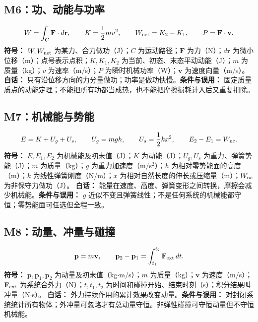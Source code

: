 \documentclass[UTF8,zihao=-4,openany,oneside,fontset=windows]{ctexbook}
\begin{document}
\subsection{M6：功、动能与功率}
\begin{equation}
W=\int_C\mathbf F\cdot d\mathbf r,\qquad K=\frac12mv^2,\qquad W_{\rm net}=K_2-K_1,\qquad P=\mathbf F\cdot\mathbf v.
\end{equation}
\textbf{符号：} $W,W_{\rm net}$ 为某力、合力做功（J）；$C$ 为运动路径；$\mathbf F$ 为力（N）；$d\mathbf r$ 为微小位移（m）；点号表示点积；$K,K_1,K_2$ 为当前、初态、末态平动动能（J）；$m$ 为质量（kg）；$v$ 为速率（m/s）；$P$ 为瞬时机械功率（W）；$\mathbf v$ 为速度向量（m/s）。
\textbf{白话：} 只有沿位移方向的力分量做功；功率是做功快慢。\textbf{条件与误用：} 固定质量质点的动能定理；不能把所有功都当成热，也不能把摩擦损耗计入后又重复扣除。

\subsection{M7：机械能与势能}
\begin{equation}
E=K+U_g+U_s,\qquad U_g=mgh,\qquad U_s=\frac12kx^2,\qquad E_2-E_1=W_{\rm nc}.
\end{equation}
\textbf{符号：} $E,E_1,E_2$ 为机械能及初末值（J）；$K$ 为动能（J）；$U_g,U_s$ 为重力、弹簧势能（J）；$m$ 为质量（kg）；$g$ 为重力加速度（m/s$^2$）；$h$ 为相对零势能面的高度（m）；$k$ 为线性弹簧刚度（N/m）；$x$ 为相对自然长度的伸长或压缩量（m）；$W_{\rm nc}$ 为非保守力做功（J）。
\textbf{白话：} 能量在速度、高度、弹簧变形之间转换，摩擦会减少机械能。\textbf{条件与误用：} $g$ 近似不变且弹簧线性；不是任何系统的机械能都守恒；零势能面可任选但全程一致。

\subsection{M8：动量、冲量与碰撞}
\begin{equation}
\mathbf p=m\mathbf v,\qquad \mathbf p_2-\mathbf p_1=\int_{t_1}^{t_2}\mathbf F_{\rm ext}\,dt.
\end{equation}
\textbf{符号：} $\mathbf p,\mathbf p_1,\mathbf p_2$ 为动量及初末值（kg$\cdot$m/s）；$m$ 为质量（kg）；$\mathbf v$ 为速度（m/s）；$\mathbf F_{\rm ext}$ 为系统合外力（N）；$t,t_1,t_2$ 为时间和碰撞开始、结束时刻（s）；积分结果叫冲量（N$\cdot$s）。
\textbf{白话：} 外力持续作用的累计效果改变动量。\textbf{条件与误用：} 对封闭系统统计所有物体；外冲量可忽略才有总动量守恒。非弹性碰撞可守恒动量但不守恒机械能。
\end{document}
